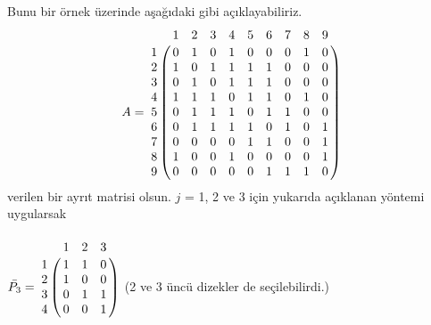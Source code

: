 \documentclass[11pt]{amsbook}
\begin{document}

Bunu bir örnek üzerinde aşağıdaki gibi açıklayabiliriz.
\[
  A =
  \bordermatrix{ & 1 & 2 & 3 & 4 & 5 & 6 & 7 & 8 & 9 \cr
    1 & 0 & 1 & 0 & 1 & 0 & 0 & 0 & 1 & 0 \cr
    2 & 1 & 0 & 1 & 1 & 1 & 1 & 0 & 0 & 0 \cr
    3 & 0 & 1 & 0 & 1 & 1 & 1 & 0 & 0 & 0 \cr
    4 & 1 & 1 & 1 & 0 & 1 & 1 & 0 & 1 & 0 \cr
    5 & 0 & 1 & 1 & 1 & 0 & 1 & 1 & 0 & 0 \cr
    6 & 0 & 1 & 1 & 1 & 1 & 0 & 1 & 0 & 1 \cr
    7 & 0 & 0 & 0 & 0 & 1 & 1 & 0 & 0 & 1 \cr
    8 & 1 & 0 & 0 & 1 & 0 & 0 & 0 & 0 & 1 \cr
    9 & 0 & 0 & 0 & 0 & 0 & 1 & 1 & 1 & 0
  }
\]
verilen bir ayrıt matrisi olsun. $j$ = 1, 2 ve 3 için yukarıda açıklanan yöntemi uygularsak
\\\\
$
  \bar{P_3} =
  \bordermatrix{ & 1 & 2 & 3 \cr
    1 & 1 & 1 & 0 \cr
    2 & 1 & 0 & 0 \cr
    3 & 0 & 1 & 1 \cr
    4 & 0 & 0 & 1
  }
$
(2 ve 3 üncü dizekler de seçilebilirdi.)
\end{document}
